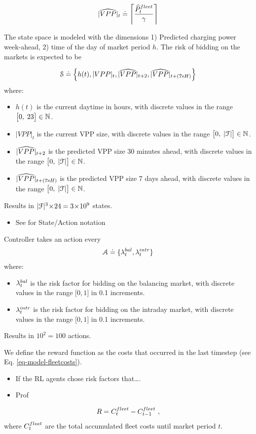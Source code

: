 \documentclass[a4paper, 12pt]{article}
\let\cite\shortcite
\begin{document}
\begin{equation}
    {|\widehat{VPP}|_{t}} \doteq \left\lceil\frac{\widehat{P}^{fleet}_{t}}{\gamma}\right\rceil
\end{equation}

The state space is modeled with the dimensions 1) Predicted charging power
week-ahead, 2) time of the day of market period \(h\). The risk of bidding on the
markets is expected to be

\begin{equation}
    {\cal S} \doteq \left\{h(t), |VPP|_t, {|\widehat{VPP}|_{t+2}}, {|\widehat{VPP}|_{t+(7\!\times\!H)}}\right\}
\end{equation}
where:
\begin{itemize}
\item \(h(t)\) is the current daytime in hours, with discrete values in the range
\(\big[0,\;23\big] \in \mathbb{N}\).
\item \(|VPP|_t\) is the current VPP size, with discrete values in the range
\(\big[0,\;|{\cal{F}}|\big] \in \mathbb{N}\).
\item \({|\widehat{VPP}|_{t+2}}\) is the predicted VPP size 30 minutes ahead, with discrete values in the range
\(\big[0,\;|{\cal{F}}|\big] \in \mathbb{N}\).
\item \({|\widehat{VPP}|_{t+(7\!\times\!H)}}\) is the predicted VPP size 7 days ahead, with discrete
values in the range \(\big[0,\;|{\cal{F}}|\big] \in \mathbb{N}\).
\end{itemize}

Results in \(|{\cal{F}}|^3\!\times\!24 = 3\!\times\!10^9\) states.


\begin{itemize}
\item See \cite{reddy11_strat} for State/Action notation
\end{itemize}

Controller takes an action every
\begin{equation}
    {\cal A} \doteq \{\lambda^{bal}_{t}, \lambda^{intr}_{t}\}
\end{equation}
where:
\begin{itemize}
\item \(\lambda^{bal}_{t}\) is the risk factor for bidding on the balancing market, with discrete
values in the range \(\big[0,1\big]\) in 0.1 increments.
\item \(\lambda^{intr}_{t}\) is the risk factor for bidding on the intraday market, with discrete
values in the range \(\big[0,1\big]\) in 0.1 increments.
\end{itemize}

Results in \(10^2 = 100\) actions.


We define the reward function as the costs that occurred in the last timestep (see Eq. \ref{eq-model-fleetcosts}).
\begin{itemize}
\item If the RL agents chose risk factors that\ldots{}.
\item Prof
\end{itemize}
\begin{equation}
    R = C^{fleet}_{t} - C^{fleet}_{t-1} \text{ ,}
\end{equation}
where \(C^{fleet}_{t}\) are the total accumulated fleet costs until market period \(t\).
\end{document}

